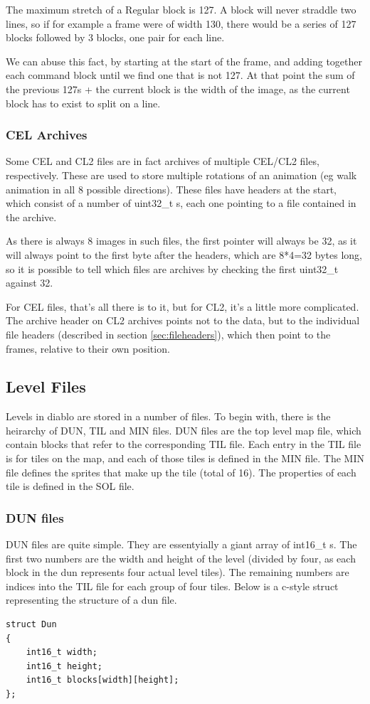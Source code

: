 \documentclass[a4paper]{article}
\begin{document}
 	The maximum stretch of a Regular block is 127. A block will never straddle two lines, so if for example a frame were of width 130, there would be a series of 127 blocks followed by 3 blocks, one pair for each line.
 	
 	We can abuse this fact, by starting at the start of the frame, and adding together each command block until we find one that is not 127. At that point the sum of the previous 127s + the current block is the width of the image, as the current block has to exist to split on a line.
 	
 	\subsubsection{CEL Archives}
 	Some CEL and CL2 files are in fact archives of multiple CEL/CL2 files, respectively. These are used to store multiple rotations of an animation (eg walk animation in all 8 possible directions). These files have headers at the start, which consist of a number of uint32\_t s, each one pointing to a file contained in the archive.
 	
 	As there is always 8 images in such files, the first pointer will always be 32, as it will always point to the first byte after the headers, which are 8*4=32 bytes long, so it is possible to tell which files are archives by checking the first uint32\_t against 32.
 	
 	For CEL files, that's all there is to it, but for CL2, it's a little more complicated. The archive header on CL2 archives points not to the data, but to the individual file headers (described in section \ref{sec:fileheaders}), which then point to the frames, relative to their own position.

\newpage

\subsection{Level Files}
    Levels in diablo are stored in a number of files. To begin with, there is the heirarchy of DUN, TIL and MIN files.
    DUN files are the top level map file, which contain blocks that refer to the corresponding TIL file. Each entry in the TIL file is for tiles on the map, and each of those tiles is defined in the MIN file. The MIN file defines the sprites that make up the tile (total of 16).
    The properties of each tile is defined in the SOL file.

    \subsubsection{DUN files}
    DUN files are quite simple. They are essentyially a giant array of int16\_t s. The first two numbers are the width and height of the level (divided by four, as each block in the dun represents four actual level tiles). The remaining numbers are indices into the TIL file for each group of four tiles. Below is a c-style struct representing the structure of a dun file.
    \begin{lstlisting}
struct Dun
{
    int16_t width;
    int16_t height;
    int16_t blocks[width][height];
};
\end{lstlisting}
\end{document}
